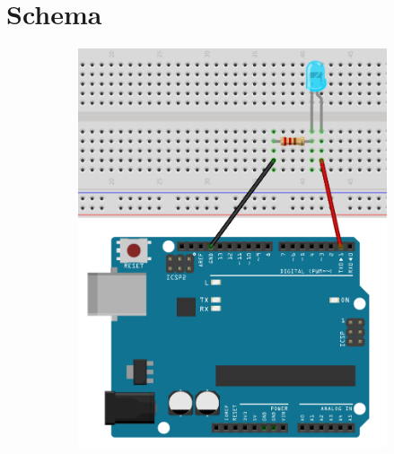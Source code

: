\section{Schema} %
\label{sec:schema}
    \begin{figure}
    \centering
        \begin{subfigure}{0.4\textwidth}
            \includegraphics[width=\textwidth]{res/img/led}    
        \end{subfigure}
        \begin{subfigure}{0.4\textwidth}

\end{subfigure}
\end{figure}
